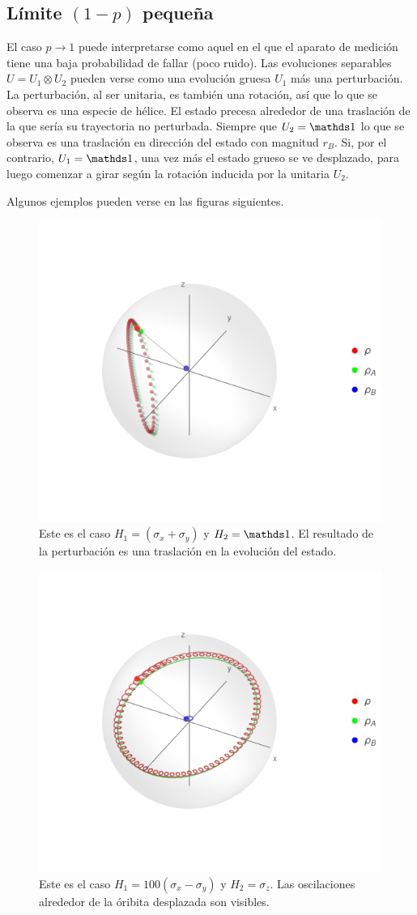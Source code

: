 \subsection{Límite $(1-p)$ pequeña}
El caso $p\rightarrow 1$ puede interpretarse como aquel en el que el aparato de medición tiene una baja probabilidad de fallar (poco ruido). Las evoluciones separables $U=U_{1}\otimes U_{2}$ pueden verse como una evolución gruesa $U_{1}$ más una perturbación. La perturbación, al ser unitaria, es también una rotación, así que lo que se observa es una especie de hélice. El estado precesa alrededor de una traslación de la que sería su trayectoria no perturbada. Siempre que $U_{2}=\Id$ lo que se observa es una traslación en dirección del estado con magnitud $r_{B}$. Si, por el contrario, $U_{1}=\Id$, una vez más el estado grueso se ve desplazado, para luego comenzar a girar según la rotación inducida por la unitaria $U_{2}$. 

Algunos ejemplos pueden verse en las figuras siguientes.

\begin{figure}[h!]
    \centering
    \includegraphics[width=0.6\linewidth]{maxent/figures/U1xU2_H1=(sx+sy)_H2=Id_z=0.9_p=0.85_sequence.png}
    \caption{Este es el caso $H_{1}=(\sigma_{x}+\sigma_{y})$ y $H_{2}=\Id$. El resultado de la perturbación es una traslación en la evolución del estado.}
    \label{fig:SmallP1}
\end{figure}


\begin{figure}[h!]
    \centering
    \includegraphics[width=0.6\linewidth]{maxent/figures/U1xU2_H1=100(sx-sy)_H2=sz_z=0.9_p=0.85_sequence.png}
    \caption{Este es el caso $H_{1}=100(\sigma_{x}-\sigma_{y})$ y $H_{2}=\sigma_{z}$. Las oscilaciones alrededor de la óribita desplazada son visibles.}
    \label{fig:SmallP2}
\end{figure}

